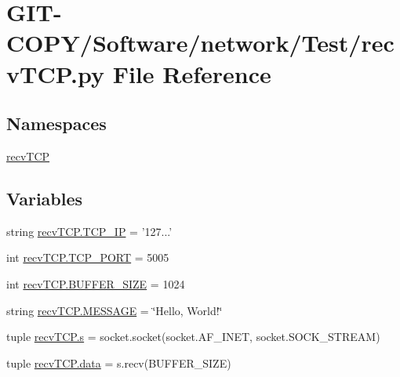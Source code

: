 \hypertarget{GIT-COPY_2Software_2network_2Test_2recvTCP_8py}{}\section{G\+I\+T-\/\+C\+O\+P\+Y/\+Software/network/\+Test/recv\+T\+C\+P.py File Reference}
\label{GIT-COPY_2Software_2network_2Test_2recvTCP_8py}
\subsection*{Namespaces}
\begin{DoxyCompactItemize}
\item 
 \hyperlink{namespacerecvTCP}{recv\+T\+C\+P}
\end{DoxyCompactItemize}
\subsection*{Variables}
\begin{DoxyCompactItemize}
\item 
string \hyperlink{namespacerecvTCP_aa05e3ee6e3ba40a6130d0ee057f07106}{recv\+T\+C\+P.\+T\+C\+P\+\_\+\+I\+P} = '127...'
\item 
int \hyperlink{namespacerecvTCP_a567a4b8a1978b161e49e7b5f6bc860ac}{recv\+T\+C\+P.\+T\+C\+P\+\_\+\+P\+O\+R\+T} = 5005
\item 
int \hyperlink{namespacerecvTCP_a4e276e5f122dc64a3a9e9759fc06e649}{recv\+T\+C\+P.\+B\+U\+F\+F\+E\+R\+\_\+\+S\+I\+Z\+E} = 1024
\item 
string \hyperlink{namespacerecvTCP_a4b1a41c5ae1629d9645ff3932c444fb8}{recv\+T\+C\+P.\+M\+E\+S\+S\+A\+G\+E} = \char`\"{}Hello, World!\char`\"{}
\item 
tuple \hyperlink{namespacerecvTCP_a3f01302de230c87561ea7d067e8a6243}{recv\+T\+C\+P.\+s} = socket.\+socket(socket.\+A\+F\+\_\+\+I\+N\+E\+T, socket.\+S\+O\+C\+K\+\_\+\+S\+T\+R\+E\+A\+M)
\item 
tuple \hyperlink{namespacerecvTCP_a29405b8c214c90736842cb457dad5d51}{recv\+T\+C\+P.\+data} = s.\+recv(B\+U\+F\+F\+E\+R\+\_\+\+S\+I\+Z\+E)
\end{DoxyCompactItemize}
